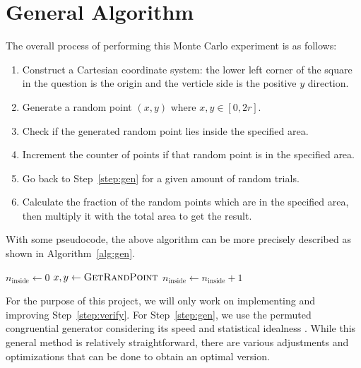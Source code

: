 \documentclass[a4paper]{article}
\begin{document}
\section{General Algorithm}
The overall process of performing this Monte Carlo experiment is as follows:
\begin{enumerate}
    \item Construct a Cartesian coordinate system: the lower left corner of the square in the question is the origin and the verticle side is the positive \(y\) direction.
    \item\label{step:gen} Generate a random point \((x, y)\) where \(x, y \in [0, 2r]\).
    \item\label{step:verify} Check if the generated random point lies inside the specified area.
    \item\label{step:incr} Increment the counter of points if that random point is in the specified area.
    \item Go back to Step~\ref{step:gen} for a given amount of random trials.
    \item Calculate the fraction of the random points which are in the specified area, then multiply it with the total area to get the result.
\end{enumerate}

With some pseudocode, the above algorithm can be more precisely described as shown in Algorithm~\ref{alg:gen}.

\begin{algorithm}
    \caption{General algorithm}\label{alg:gen}
    \begin{algorithmic}[1]
            \State{} \(n_\text{inside} \gets 0\) 
            \State{}
            \Repeat{}
                \State{} \(x, y \gets \Call{GetRandPoint}{}\)
                    \State{} \(n_\text{inside} \gets n_\text{inside} + 1\)
                \EndIf{}
            \State{}
        \EndProcedure{}
    \end{algorithmic}
\end{algorithm}

For the purpose of this project, we will only work on implementing and improving Step~\ref{step:verify}. For Step~\ref{step:gen}, we use the permuted congruential generator considering its speed and statistical idealness \autocite{pcg2014}. While this general method is relatively straightforward, there are various adjustments and optimizations that can be done to obtain an optimal version.
\end{document}
